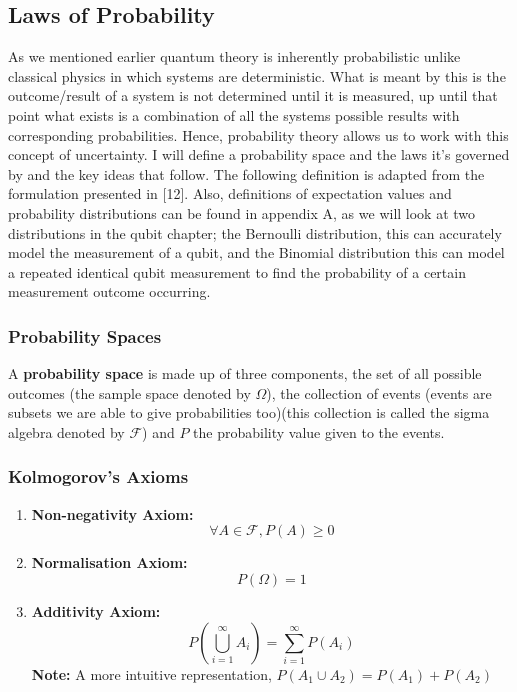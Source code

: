 \subsection{Laws of Probability}
As we mentioned earlier quantum theory is inherently probabilistic unlike classical physics in which systems are deterministic. What is meant by this is the outcome/result of a system is not determined until it is measured, up until that point what exists is a combination of all the systems possible results with corresponding probabilities. Hence, probability theory allows us to work with this concept of uncertainty. I will define a probability space and the laws it's governed by and the key ideas that follow. The following definition is adapted from the formulation presented in [12]. Also, definitions of expectation values and probability distributions can be found in appendix A, as we will look at two distributions in the qubit chapter; the Bernoulli distribution, this can accurately model the measurement of a qubit, and the Binomial distribution this can model a repeated identical qubit measurement to find the probability of a certain measurement outcome occurring.

\subsubsection{Probability Spaces}
A \textbf{probability space} is made up of three components, the set of all possible outcomes (the sample space denoted by $\Omega$), the collection of events (events are subsets we are able to give probabilities too)(this collection is called the sigma algebra denoted by $\mathcal{F}$) and $P$ the probability value given to the events.

\subsubsection{Kolmogorov’s Axioms}
\begin{enumerate}
    \item \textbf{Non-negativity Axiom:}
            \begin{equation}
            \forall  A \in \mathcal{F},  P(A) \geq 0
            \end{equation}
    \item \textbf{Normalisation Axiom:}
            \begin{equation}
            P(\Omega) = 1
            \end{equation}
    \item \textbf{Additivity Axiom:}\\
            \begin{equation}
            P\left( \bigcup_{i=1}^\infty A_i \right) = \sum_{i=1}^\infty P(A_i)
            \end{equation}
            \textbf{Note:} A more intuitive representation, \( P(A_1 \cup A_2) = P(A_1) + P(A_2) \)
\end{enumerate}



